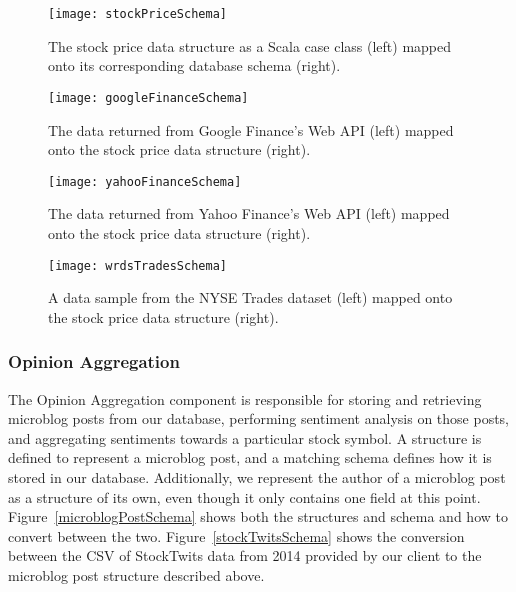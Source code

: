 \begin{figure}[h]
  \label{stockPriceSchema}
  \begin{center}
    \texttt{[image: stockPriceSchema]}
  \end{center}
  \caption{The stock price data structure as a Scala case class (left) mapped onto its corresponding database schema (right).}
\end{figure}

\begin{figure}[h]
  \label{googleFinanceSchema}
  \begin{center}
    \texttt{[image: googleFinanceSchema]}
  \end{center}
  \caption{The data returned from Google Finance's Web API (left) mapped onto the stock price data structure (right).}
\end{figure}

\begin{figure}[h]
  \label{yahooFinanceSchema}
  \begin{center}
    \texttt{[image: yahooFinanceSchema]}
  \end{center}
  \caption{The data returned from Yahoo Finance's Web API (left) mapped onto the stock price data structure (right).}
\end{figure}

\begin{figure}[h]
  \label{wrdsTradesSchema}
  \begin{center}
    \texttt{[image: wrdsTradesSchema]}
  \end{center}
  \caption{A data sample from the NYSE Trades dataset (left) mapped onto the stock price data structure (right).}
\end{figure}

\subsubsection{Opinion Aggregation}

The Opinion Aggregation component is responsible for storing and retrieving microblog posts from our database, performing sentiment analysis on those posts, and aggregating sentiments towards a particular stock symbol. A structure is defined to represent a microblog post, and a matching schema defines how it is stored in our database. Additionally, we represent the author of a microblog post as a structure of its own, even though it only contains one field at this point. Figure~\ref{microblogPostSchema} shows both the structures and schema and how to convert between the two. Figure~\ref{stockTwitsSchema} shows the conversion between the CSV of StockTwits data from 2014 provided by our client to the microblog post structure described above.

